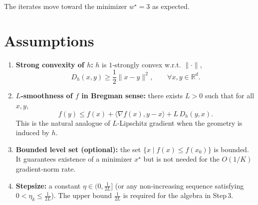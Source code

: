 \documentclass{article}
\newcommand{\breg}[2]{D_h(#1,#2)}
\begin{document}
The iterates move toward the minimizer $w^$ as expected.

\newpage
\section*{Assumptions}
\begin{enumerate}
\item[(A1)] \textbf{Strong convexity of $h$:} $h$ is $1$‑strongly convex w.r.t. $\|\cdot\|$,
\[
\breg{x}{y}\ge\frac12\|x-y\|^{2},\qquad\forall x,y\in\mathbb{R}^d.
\]

\item[(A2)] \textbf{$L$‑smoothness of $f$ in Bregman sense:} there exists $L>0$ such that for all $x,y$,
\begin{equation}\label{eq:smooth}
f(y)\le f(x)+\langle\nabla f(x),y-x\rangle+L\,\breg{y}{x}.
\end{equation}
This is the natural analogue of $L$‑Lipschitz gradient when the geometry is induced by $h$.

\item[(A3)] \textbf{Bounded level set (optional):} the set $\{x\mid f(x)\le f(x_0)\}$ is bounded.  It guarantees existence of a minimizer $x^\star$ but is not needed for the $O(1/K)$ gradient‑norm rate.

\item[(A4)] \textbf{Stepsize:} a constant $\eta\in\big(0,\big]$ (or any non‑increasing sequence satisfying $0<\eta_k\le{}$).  The upper bound $$ is required for the algebra in Step 3.
\end{enumerate}
\end{document}
